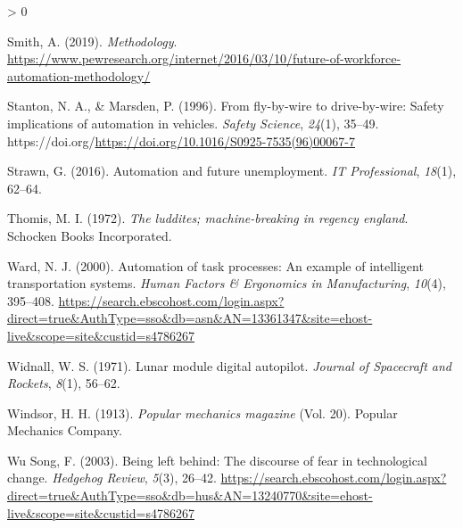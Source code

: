 \documentclass[
  english,
  man]{apa7}
\newlength{\cslhangindent}
\newenvironment{CSLReferences}[2] %
 {%
  \setlength{\parindent}{0pt}
  \ifodd #1 \everypar{\setlength{\hangindent}{\cslhangindent}}\ignorespaces\fi
  \ifnum #2 > 0
  \setlength{\parskip}{#2\baselineskip}
  \fi
 }%
 {}
\begin{document}
\begin{CSLReferences}{1}{0}
\leavevmode\hypertarget{ref-smith_2019}{}%
Smith, A. (2019). \emph{Methodology}. \url{https://www.pewresearch.org/internet/2016/03/10/future-of-workforce-automation-methodology/}

\leavevmode\hypertarget{ref-STANTON199635}{}%
Stanton, N. A., \& Marsden, P. (1996). From fly-by-wire to drive-by-wire: Safety implications of automation in vehicles. \emph{Safety Science}, \emph{24}(1), 35--49. https://doi.org/\url{https://doi.org/10.1016/S0925-7535(96)00067-7}

\leavevmode\hypertarget{ref-strawn2016automation}{}%
Strawn, G. (2016). Automation and future unemployment. \emph{IT Professional}, \emph{18}(1), 62--64.

\leavevmode\hypertarget{ref-thomis1972luddites}{}%
Thomis, M. I. (1972). \emph{The luddites; machine-breaking in regency england}. Schocken Books Incorporated.

\leavevmode\hypertarget{ref-1336134720000101}{}%
Ward, N. J. (2000). Automation of task processes: An example of intelligent transportation systems. \emph{Human Factors \& Ergonomics in Manufacturing}, \emph{10}(4), 395--408. \url{https://search.ebscohost.com/login.aspx?direct=true\&AuthType=sso\&db=asn\&AN=13361347\&site=ehost-live\&scope=site\&custid=s4786267}

\leavevmode\hypertarget{ref-widnall1971lunar}{}%
Widnall, W. S. (1971). Lunar module digital autopilot. \emph{Journal of Spacecraft and Rockets}, \emph{8}(1), 56--62.

\leavevmode\hypertarget{ref-windsor1913popular}{}%
Windsor, H. H. (1913). \emph{Popular mechanics magazine} (Vol. 20). Popular Mechanics Company.

\leavevmode\hypertarget{ref-1324077020030101}{}%
Wu Song, F. (2003). Being left behind: The discourse of fear in technological change. \emph{Hedgehog Review}, \emph{5}(3), 26--42. \url{https://search.ebscohost.com/login.aspx?direct=true\&AuthType=sso\&db=hus\&AN=13240770\&site=ehost-live\&scope=site\&custid=s4786267}

\end{CSLReferences}

\endgroup
\end{document}
